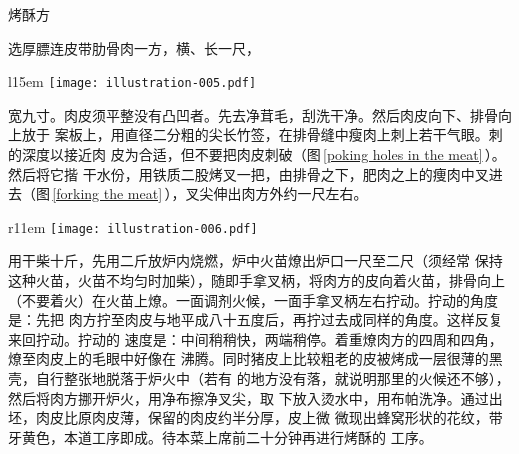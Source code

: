 \begin{recipe}{烤酥方}

\ingredients


\preparation

\step[选料及处理] 选厚膘连皮带肋骨肉一方，横、长一尺，
\begin{wrapfigure}[9]{l}{15em}%
\centering%
\vspace{-.875\baselineskip}%
\texttt{[image: illustration-005.pdf]}%
\vspace{-.125\baselineskip}%
\caption{刺气眼}
\label{poking holes in the meat}
\end{wrapfigure}
宽九寸。肉皮须平整没有凸凹者。先去净茸毛，刮洗干净。然后肉皮向下、排骨向上放于
案板上，用直径二分粗的尖长竹签，在排骨缝中瘦肉上刺上若干气眼。刺的深度以接近肉
皮为合适，但不要把肉皮刺破（图\,\ref{poking holes in the meat}\,）。然后将它揩
干水份，用铁质二股烤叉一把，由排骨之下，肥肉之上的痩肉中叉进去（图\,\ref{forking
the meat}\,），叉尖伸出肉方外约一尺左右。

\begin{wrapfigure}[13]{r}{11em}%
\centering%
\vspace{-2\baselineskip}%
\texttt{[image: illustration-006.pdf]}%
\vspace{-.625\baselineskip}%
\caption{叉肉}
\label{forking the meat}
\end{wrapfigure}
%

\step[出坯] 用干柴十斤，先用二斤放炉内烧燃，炉中火苗燎出炉口一尺至二尺（须经常
保持这种火苗，火苗不均匀时加柴），随即手拿叉柄，将肉方的皮向着火苗，排骨向上
（不要着火）在火苗上燎。一面调剂火候，一面手拿叉柄左右拧动。拧动的角度是：先把
肉方拧至肉皮与地平成八十五度后，再拧过去成同样的角度。这样反复来回拧动。拧动的
速度是：中间稍稍快，两端稍停。着重燎肉方的四周和四角，燎至肉皮上的毛眼中好像在
沸腾。同时猪皮上比较粗老的皮被烤成一层很薄的黑壳，自行整张地脱落于炉火中（若有
的地方没有落，就说明那里的火候还不够），然后将肉方挪开炉火，用净布擦净叉尖，取
下放入烫水中，用布帕洗净。通过出坯，肉皮比原肉皮薄，保留的肉皮约半分厚，皮上微
微现出蜂窝形状的花纹，带牙黄色，本道工序即成。待本菜上席前二十分钟再进行烤酥的
工序。


\end{recipe}
